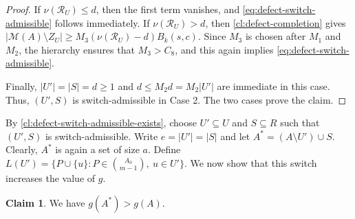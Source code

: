 \documentclass[10pt,a4paper]{article}
\numberwithin{equation}{section}
\theoremstyle{definition}
\newtheorem{claim}[claim]{Claim}
\newcommand{\M}{\mathcal M}
\newcommand{\Rcal}{\mathcal R}
\begin{document}
\begin{proof}
        If $\nu(\Rcal_U)\le d$, then the first term vanishes, and
        \eqref{eq:defect-switch-admissible} follows immediately.
        If $\nu(\Rcal_U)>d$, then \cref{cl:defect-completion} gives
        $|\M(A)\setminus Z_U|\ge
                M_3(\nu(\Rcal_U)-d)B_k(s,c)$.
        Since $M_3$ is chosen after $M_1$ and $M_2$, the hierarchy
        ensures that $M_3>C_8$, and this again implies
        \eqref{eq:defect-switch-admissible}.

        Finally, $|U'|=|S|=d\ge1$ and
        $d\le M_2d=M_2|U'|$ are immediate in this case.
        Thus, $(U',S)$ is switch-admissible in Case 2.
        The two cases prove the claim.
\end{proof}

By \cref{cl:defect-switch-admissible-exists}, choose
$U'\subseteq U$ and $S\subseteq R$ such that $(U',S)$ is switch-admissible.
Write $e=|U'|=|S|$ and let $A^*=(A\setminus U')\cup S$.
Clearly, $A^*$ is again a set of size $a$.
Define $L(U')=\{P\cup\{u\}:P\in\binom{A_0}{m-1},\ u\in U'\}$.
We now show that this switch increases the value of $g$.

\begin{claim}\label{cl:defect-center-switch}
        We have $g(A^*)>g(A)$.
\end{claim}
\end{document}
